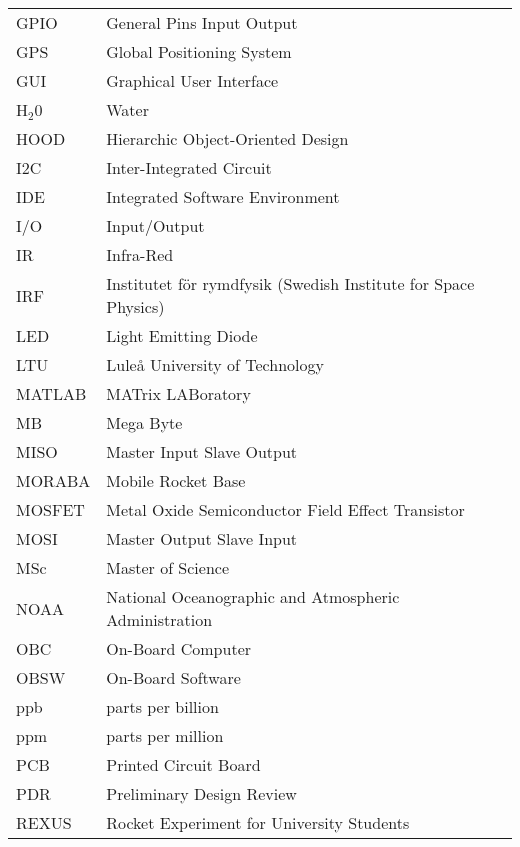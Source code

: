\begin{longtable}{p{3cm} p{9cm}}
             GPIO        & General Pins Input Output\\
             GPS         & Global Positioning System\\
             GUI         & Graphical User Interface\\
             H$_2$0      & Water \\
             HOOD        & Hierarchic Object-Oriented Design\\
             I2C         & Inter-Integrated Circuit \\
             IDE         & Integrated Software Environment \\
             I/O         & Input/Output\\
             IR          & Infra-Red\\
             IRF         & Institutet för rymdfysik (Swedish Institute for Space Physics)\\
             LED         & Light Emitting Diode\\
             LTU         & Luleå University of Technology \\
             MATLAB      & MATrix LABoratory\\
             MB          & Mega Byte\\
             MISO        & Master Input Slave Output\\
             MORABA      & Mobile Rocket Base \\
             MOSFET      & Metal Oxide Semiconductor Field Effect Transistor\\
             MOSI        & Master Output Slave Input\\
             MSc         & Master of Science \\
             NOAA        & National Oceanographic and Atmospheric Administration \\
             OBC         & On-Board Computer\\
             OBSW        & On-Board Software\\
             ppb         & parts per billion\\
             ppm         & parts per million\\
             PCB         & Printed Circuit Board\\
             PDR         & Preliminary Design Review\\
             REXUS       & Rocket Experiment for University Students \\

\end{longtable}
